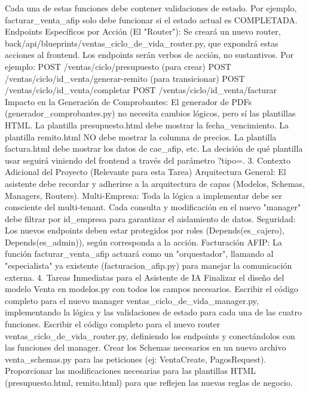 Cada una de estas funciones debe contener validaciones de estado. Por ejemplo, facturar_venta_afip solo debe funcionar si el estado actual es COMPLETADA.
Endpoints Específicos por Acción (El "Router"):
Se creará un nuevo router, back/api/blueprints/ventas_ciclo_de_vida_router.py, que expondrá estas acciones al frontend.
Los endpoints serán verbos de acción, no sustantivos. Por ejemplo:
POST /ventas/ciclo/presupuesto (para crear)
POST /ventas/ciclo/{id_venta}/generar-remito (para transicionar)
POST /ventas/ciclo/{id_venta}/completar
POST /ventas/ciclo/{id_venta}/facturar
Impacto en la Generación de Comprobantes:
El generador de PDFs (generador_comprobantes.py) no necesita cambios lógicos, pero sí las plantillas HTML.
La plantilla presupuesto.html debe mostrar la fecha_vencimiento.
La plantilla remito.html NO debe mostrar la columna de precios.
La plantilla factura.html debe mostrar los datos de cae_afip, etc.
La decisión de qué plantilla usar seguirá viniendo del frontend a través del parámetro ?tipo=.
3. Contexto Adicional del Proyecto (Relevante para esta Tarea)
Arquitectura General: El asistente debe recordar y adherirse a la arquitectura de capas (Modelos, Schemas, Managers, Routers).
Multi-Empresa: Toda la lógica a implementar debe ser consciente del multi-tenant. Cada consulta y modificación en el nuevo "manager" debe filtrar por id_empresa para garantizar el aislamiento de datos.
Seguridad: Los nuevos endpoints deben estar protegidos por roles (Depends(es_cajero), Depends(es_admin)), según corresponda a la acción.
Facturación AFIP: La función facturar_venta_afip actuará como un "orquestador", llamando al "especialista" ya existente (facturacion_afip.py) para manejar la comunicación externa.
4. Tareas Inmediatas para el Asistente de IA
Finalizar el diseño del modelo Venta en modelos.py con todos los campos necesarios.
Escribir el código completo para el nuevo manager ventas_ciclo_de_vida_manager.py, implementando la lógica y las validaciones de estado para cada una de las cuatro funciones.
Escribir el código completo para el nuevo router ventas_ciclo_de_vida_router.py, definiendo los endpoints y conectándolos con las funciones del manager.
Crear los Schemas necesarios en un nuevo archivo venta_schemas.py para las peticiones (ej: VentaCreate, PagosRequest).
Proporcionar las modificaciones necesarias para las plantillas HTML (presupuesto.html, remito.html) para que reflejen las nuevas reglas de negocio.


